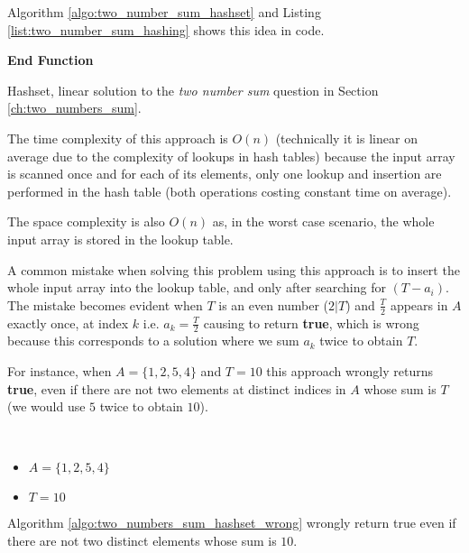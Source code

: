 Algorithm \ref{algo:two_number_sum_hashset} and Listing \ref{list:two_number_sum_hashing} shows this idea in code.

\begin{algorithm}
	   
	
    \textbf{End Function}

		\caption{Hashset, linear solution to the \textit{two number sum} question in Section
		\ref{ch:two_numbers_sum}.}
		\label{algo:two_number_sum_hashset}
\end{algorithm}




The time complexity of this approach is $O(n)$ (technically it is linear on average due to the complexity of lookups in hash tables) because the input array is scanned once and for each
of its elements, only one lookup and insertion are performed in the hash table (both operations costing constant time on average).

The space complexity
is also $O(n)$ as, in the worst case scenario,  the whole input array is stored in the lookup table.

A common mistake when solving this problem using this approach is to insert the whole input array into the lookup table, and only after searching for $(T-a_i)$.
The mistake becomes evident when $T$ is an even number ($2 | T$) and $\frac{T}{2}$ appears in $A$  exactly once, at index $k$ i.e. $a_k = \frac{T}{2}$ causing  to return \textbf{true}, which is wrong because this corresponds to a solution where we sum $a_k$ twice to obtain $T$.

For instance, when $A=\{1,2,5,4\}$ and $T=10$ this approach wrongly returns \textbf{true}, even if there are not two elements at distinct indices in $A$ whose sum is $T$ (we would use $5$ twice to obtain $10$).
\begin{example}
	\hfill \\ 
	\begin{itemize}
		\item[] $A=\{1,2,5,4\}$
	\item[] $T = 10$
\end{itemize}
	Algorithm \ref{algo:two_numbers_sum_hashset_wrong} wrongly return true even if there are not two
	distinct elements whose sum is $10$.
\end{example}


